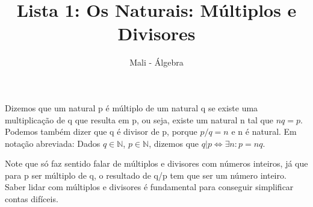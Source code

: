 \documentclass{article}
\title{Lista 1: Os Naturais: Múltiplos e Divisores}
\author{Mali - Álgebra}
\begin{document}
\maketitle

Dizemos que um natural p é múltiplo de um natural q se existe uma multiplicação de q que resulta em p, ou seja,
existe um natural n tal que $nq = p$. Podemos também dizer que q é divisor de p, porque $p/q = n$ e n é natural.
Em notação abreviada: Dados $q \in \mathbb{N}$, $p \in \mathbb{N}$, dizemos que $q|p \iff \exists n : p = nq$.

Note que só faz sentido falar de múltiplos e divisores com números inteiros, já que para p ser múltiplo de q, o resultado
de q/p tem que ser um número inteiro. Saber lidar com múltiplos e divisores é fundamental para conseguir simplificar
contas difíceis.
\end{document}
